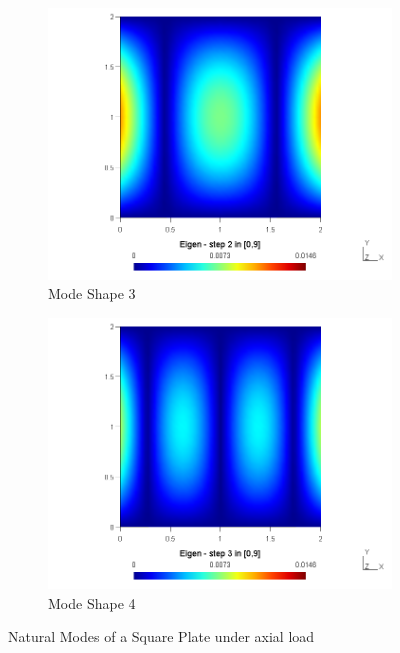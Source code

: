 \documentclass[main.tex]{subfiles}
\begin{document}
\begin{figure}[h!]
\begin{subfigure}{.49\textwidth}
\includegraphics[width=\linewidth,trim={4cm 0 4cm 0},clip]{images/VMP09/3.png}
\caption{Mode Shape 3}
\end{subfigure}\hfill
\begin{subfigure}{.49\textwidth}
\includegraphics[width=\linewidth,trim={4cm 0 4cm 0},clip]{images/VMP09/4.png}
\caption{Mode Shape 4}
\end{subfigure} 

\caption{Natural Modes of a Square Plate under axial load}
\end{figure}
\end{document}
